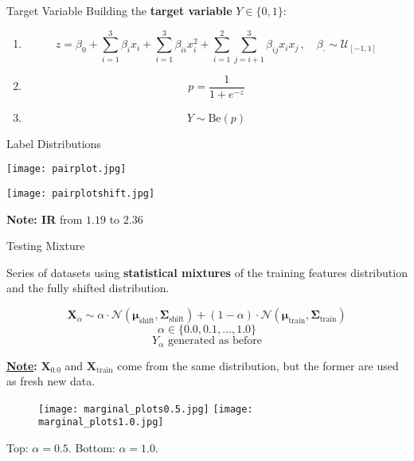 \begin{frame}{Target Variable}
    Building the \textbf{target variable} $Y\in\{0,1\}$:

    \begin{enumerate}
        \item $$ 
        z = \beta_0 + \sum_{i=1}^3 \beta_i x_i + \sum_{i=1}^3 \beta_{ii} x_i^2 + \sum_{i=1}^{2} \sum_{j=i+1}^3 \beta_{ij} x_i x_j\,,   \quad \beta_{\cdot} \sim \mathcal{U}_{[-1,1]}
        $$
        \item $$ p = \frac{1}{1 + e^{-z}}$$
        \item $$ Y \sim \text{Be}(p)$$
    \end{enumerate}
\end{frame}

\begin{frame}{Label Distributions} 
    \vfill
    \centering
    \begin{minipage}{0.45\textwidth}
        \centering
        \texttt{[image: pairplot.jpg]}
    \end{minipage}
    \hfill
    \begin{minipage}{0.45\textwidth}
        \centering
        \texttt{[image: pairplotshift.jpg]}
    \end{minipage}
    \vfill
    \textbf{Note: IR} from $1.19$ to $2.36$ 
    \vfill

\end{frame}


\begin{frame}{Testing Mixture}
    
    Series of datasets using \textbf{statistical mixtures} of the training features distribution and the fully shifted distribution.

    $$
    \boldsymbol{X}_\alpha \sim \alpha\cdot\mathcal{N}(\boldsymbol{\mu}_{\text{shift}}, \boldsymbol{\Sigma}_{\text{shift}}) + (1-\alpha)\cdot\mathcal{N}(\boldsymbol{\mu}_{\text{train}}, \boldsymbol{\Sigma}_{\text{train}})
    $$
    $$
    \alpha \in \{0.0, 0.1, \dots, 1.0\}
    $$
    $$
    Y_\alpha \text{ generated as before}
    $$

    \textbf{\underline{Note}:} $\boldsymbol{X}_{0.0}$ and $\boldsymbol{X}_{\text{train}}$ come from the same distribution, but the former are used as fresh new data.

\end{frame}

\begin{frame}
    \vfill
    \begin{figure}
        \centering
        \texttt{[image: marginal\_plots0.5.jpg]}
        \texttt{[image: marginal\_plots1.0.jpg]}
    \end{figure}
    Top: $\alpha=0.5$. Bottom: $\alpha=1.0$.
\end{frame}


